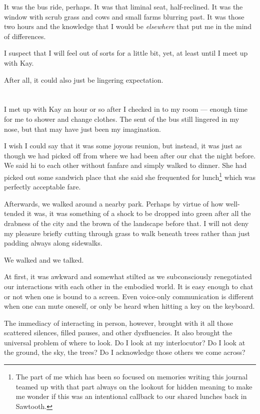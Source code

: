 It was the bus ride, perhaps. It was that liminal seat, half-reclined. It was the window with scrub grass and cows and small farms blurring past. It was those two hours and the knowledge that I would be \emph{elsewhere} that put me in the mind of differences.

I suspect that I will feel out of sorts for a little bit, yet, at least until I meet up with Kay.

After all, it could also just be lingering expectation.

\section{}

I met up with Kay an hour or so after I checked in to my room --- enough time for me to shower and change clothes. The sent of the bus still lingered in my nose, but that may have just been my imagination.

I wish I could say that it was some joyous reunion, but instead, it was just as though we had picked off from where we had been after our chat the night before. We said hi to each other without fanfare and simply walked to dinner. She had picked out some sandwich place that she said she frequented for lunch\footnote{The part of me which has been so focused on memories writing this journal teamed up with that part always on the lookout for hidden meaning to make me wonder if this was an intentional callback to our shared lunches back in Sawtooth.} which was perfectly acceptable fare.

Afterwards, we walked around a nearby park. Perhaps by virtue of how well-tended it was, it was something of a shock to be dropped into green after all the drabness of the city and the brown of the landscape before that. I will not deny my pleasure briefly cutting through grass to walk beneath trees rather than just padding always along sidewalks.

We walked and we talked.

At first, it was awkward and somewhat stilted as we subconsciously renegotiated our interactions with each other in the embodied world. It is easy enough to chat or not when one is bound to a screen. Even voice-only communication is different when one can mute oneself, or only be heard when hitting a key on the keyboard.

The immediacy of interacting in person, however, brought with it all those scattered silences, filled pauses, and other dysfluencies. It also brought the universal problem of where to look. Do I look at my interlocutor? Do I look at the ground, the sky, the trees? Do I acknowledge those others we come across?


